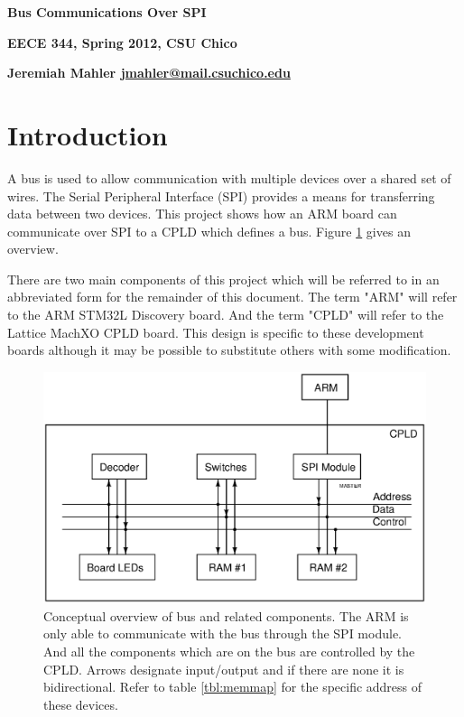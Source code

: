\documentclass{article}
\begin{document}

\centerline{\Large \textbf{Bus Communications Over SPI}}
\vspace{2em}
\centerline{\small \textbf{EECE 344, Spring 2012, CSU Chico}}
\vspace{0.5em}
\centerline{\small \textbf{Jeremiah Mahler \href{mailto:jmahler@mail.csuchico.edu}{jmahler@mail.csuchico.edu}}}
\vspace{2em}
\thispagestyle{empty}



\section{Introduction}

A bus is used to allow communication with multiple devices
over a shared set of wires.
The Serial Peripheral Interface (SPI) provides a means
for transferring data between two devices.
This project shows how an ARM board can communicate over
SPI to a CPLD which defines a bus.
Figure \ref{fig:bus} gives an overview.

There are two main components of this project which
will be referred to in an abbreviated form for the remainder of this document.
The term "ARM" will refer to the ARM STM32L Discovery\cite{UM1079} board.
And the term "CPLD" will refer to the Lattice MachXO\cite{EB66}
CPLD board.
This design is specific to these development boards although it
may be possible to substitute others with some modification.

\begin{figure}[hbp]
\center
\includegraphics[scale=0.7]{figures/schematics/BUS}
\caption{Conceptual overview of bus and related components.
The ARM is only able to communicate with the bus through the SPI
module.
And all the components which are on the bus are controlled by the
CPLD.
Arrows designate input/output and if there are none it is bidirectional.
Refer to table \ref{tbl:memmap} for the specific address of these devices.
}
\label{fig:bus}
\end{figure}
\end{document}
